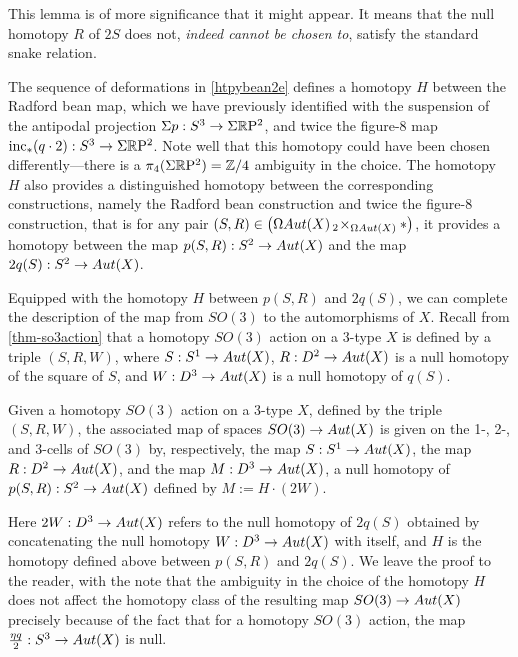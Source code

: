 \documentclass{amsart}
\begin{document}
\begin{remark}
This lemma is of more significance that it might appear.  It means that the null homotopy $R$ of $2S$ does not, \emph{indeed cannot be chosen to}, satisfy the standard snake relation.
\end{remark}
The sequence of deformations in \cref{htpybean2e} defines a homotopy $H$ between the Radford bean map, which we have previously identified with the suspension of the antipodal projection $\Sigma p : S^3 \rightarrow \Sigma \mathbb R \mathrm{P}^2$, and twice the figure-8 map $\mathrm{inc}_*(q \cdot 2) : S^3 \rightarrow \Sigma \mathbb R \mathrm{P}^2$.  Note well that this homotopy could have been chosen differently---there is a $\pi_4(\Sigma\mathbb R \mathrm{P}^2) = \mathbb Z/4$ ambiguity in the choice.  The homotopy $H$ also provides a distinguished homotopy between the corresponding constructions, namely the Radford bean construction and twice the figure-8 construction, that is for any pair $(S, R) \in \left(\Omega Aut(X) \,_2\! \times_{\Omega Aut(X)} \ast\right)$, it provides a homotopy between the map $p(S,R): S^2 \rightarrow Aut(X)$ and the map $2 q(S): S^2 \rightarrow Aut(X)$.

Equipped with the homotopy $H$ between $p(S,R)$ and $2 q(S)$, we can complete the description of the map from $SO(3)$ to the automorphisms of $X$.  Recall from \cref{thm-so3action} that a homotopy $SO(3)$ action on a 3-type $X$ is defined by a triple $(S,R,W)$, where $S: S^1 \rightarrow Aut(X)$, $R: D^2 \rightarrow Aut(X)$ is a null homotopy of the square of $S$, and $W: D^3 \rightarrow Aut(X)$ is a null homotopy of $q(S)$.
\begin{proposition} 
\label{prop-so3map}
Given a homotopy $SO(3)$ action on a 3-type $X$, defined by the triple $(S,R,W)$, the associated map of spaces $SO(3) \rightarrow Aut(X)$ is given on the 1-, 2-, and 3-cells of $SO(3)$ by, respectively, the map $S: S^1 \rightarrow Aut(X)$, the map $R: D^2 \rightarrow Aut(X)$, and the map $M: D^3 \rightarrow Aut(X)$, a null homotopy of $p(S,R): S^2 \rightarrow Aut(X)$ defined by $M:=H \cdot (2 W)$.
\end{proposition}
\nid Here $2 W: D^3 \rightarrow Aut(X)$ refers to the null homotopy of $2 q(S)$ obtained by concatenating the null homotopy $W: D^3 \rightarrow Aut(X)$ with itself, and $H$ is the homotopy defined above between $p(S,R)$ and $2 q(S)$.  We leave the proof to the reader, with the note that the ambiguity in the choice of the homotopy $H$ does not affect the homotopy class of the resulting map $SO(3) \rightarrow Aut(X)$ precisely because of the fact that for a homotopy $SO(3)$ action, the map $\frac{\eta q}{2}: S^3 \rightarrow Aut(X)$ is null. 
\end{document}
